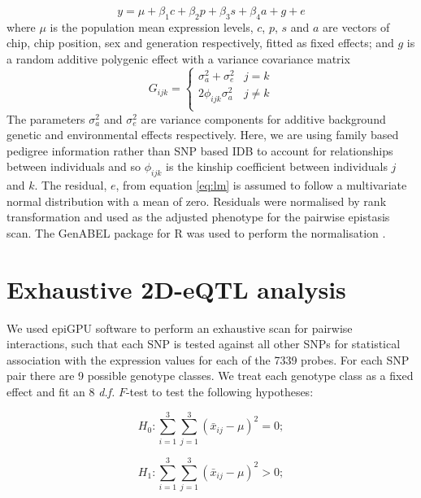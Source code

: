 \documentclass{article}
\begin{document}
\begin{equation}
y = \mu + \beta_{1}c + \beta_{2}p + \beta_{3}s + \beta_{4}a + g + e
\label{eq:lm}
\end{equation}
where $\mu$ is the population mean expression levels, $c$, $p$, $s$ and $a$ are vectors of chip, chip position, sex and generation respectively, fitted as fixed effects; and $g$ is a random additive polygenic effect with a variance covariance matrix 
\begin{equation}
G_{ijk} = \left \{ 
\begin{array}{ll}
\sigma _a ^2 + \sigma _e ^2&        j = k \\ 
2\phi _{ijk} \sigma _a ^2& 			j \neq k \\
\end{array} \right.
\end{equation}
The parameters $\sigma_a^2$ and $\sigma_e^2$ are variance components for additive background genetic and environmental effects respectively. Here, we are using family based pedigree information rather than SNP based IDB to account for relationships between individuals and so $\phi _{ijk}$ is the kinship coefficient between individuals $j$ and $k$. The residual, $e$, from equation \ref{eq:lm} is assumed to follow a multivariate normal distribution with a mean of zero. Residuals were normalised by rank transformation and used as the adjusted phenotype for the pairwise epistasis scan. The GenABEL package for R was used to perform the normalisation \cite{Aulchenko2007}.


\section{Exhaustive 2D-eQTL analysis}

We used epiGPU \cite{Hemani2011} software to perform an exhaustive scan for pairwise interactions, such that each SNP is tested against all other SNPs for statistical association with the expression values for each of the 7339 probes. For each SNP pair there are 9 possible genotype classes. We treat each genotype class as a fixed effect and fit an 8 \emph{d.f.} $F$-test to test the following hypotheses:

\begin{equation}
H _0 : \sum _{i=1} ^3 \sum _{j=1} ^3 (\bar x _{ij} - \mu) ^2 = 0; 
\end{equation}

\begin{equation}
H _1 : \sum _{i=1} ^3 \sum _{j=1} ^3 (\bar x _{ij} - \mu) ^2 > 0; 
\label{eq:8df}
\end{equation}
\end{document}
